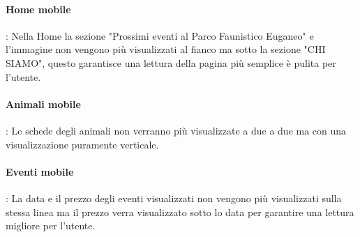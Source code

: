         \paragraph{Home mobile} : Nella Home la sezione "Prossimi eventi al Parco Faunistico Euganeo" e l'immagine non vengono più visualizzati al fianco ma sotto la sezione "CHI SIAMO", questo garantisce una lettura della pagina più semplice è pulita per l'utente.

        \paragraph{Animali mobile}: Le schede degli animali non verranno più visualizzate a due a due ma con una visualizzazione puramente verticale. 

        \paragraph{Eventi mobile}: La data e il prezzo degli eventi visualizzati non vengono più visualizzati sulla stessa linea ma il prezzo verra visualizzato sotto lo data per garantire una lettura migliore per l'utente.		   
    \pagebreak